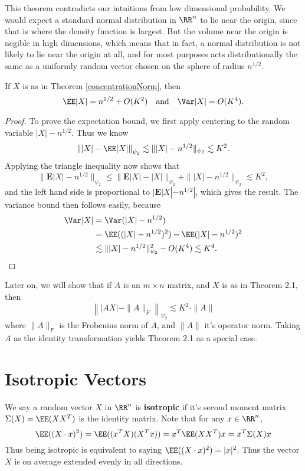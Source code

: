 This theorem contradicts our intuitions from low dimensional probability. We would expect a standard normal distribution in $\RR^n$ to lie near the origin, since that is where the density function is largest. But the volume near the origin is negible in high dimensions, which means that in fact, a normal distribution is not likely to lie near the origin at all, and for most purposes acts distributionally the same as a uniformly random vector chosen on the sphere of radius $n^{1/2}$.

\begin{corollary}
    If $X$ is as in Theorem \ref{concentrationNorm}, then
    \[ \EE |X| = n^{1/2} + O(K^2)\quad\text{and}\quad\Var |X| = O(K^4). \]
\end{corollary}
\begin{proof}
    To prove the expectation bound, we first apply centering to the random variable $|X| - n^{1/2}$. Thus we know
    \[ \left\| |X| - \EE |X| \right\|_{\psi_2} \lesssim \| |X| - n^{1/2} \|_{\psi_2} \lesssim K^2. \]
    Applying the triangle inequality now shows that
    \[ \| \mathbf{E} |X| - n^{1/2} \|_{\psi_2} \leq \| \mathbf{E} |X| - |X| \|_{\psi_2} + \| |X| - n^{1/2} \|_{\psi_2} \lesssim K^2, \]
    and the left hand side is proportional to $| \mathbf{E} |X| - n^{1/2} |$, which gives the result. The variance bound then follows easily, because
    \begin{align*}
        \Var |X| &= \Var(|X| - n^{1/2})\\
        &= \EE((|X| - n^{1/2})^2) - \EE(|X| - n^{1/2})^2\\
        &\lesssim \| |X| - n^{1/2} \|_{\psi_2}^2 - O(K^4) \lesssim K^4. \qedhere
    \end{align*}
\end{proof}

Later on, we will show that if $A$ is an $m \times n$ matrix, and $X$ is as in Theorem 2.1, then
%
\[ \left\| |AX| - \| A \|_F \right\|_{\psi_2} \lesssim K^2 \cdot \| A \| \]
%
where $\| A \|_F$ is the Frobenius norm of $A$, and $\| A \|$ it's operator norm. Taking $A$ as the identity transformation yields Theorem 2.1 as a special case.

\section{Isotropic Vectors}

We say a random vector $X$ in $\RR^n$ is \textbf{isotropic} if it's second moment matrix $\Sigma(X) = \EE(XX^T)$ is the identity matrix. Note that for any $x \in \RR^n$,
%
\[ \EE((X \cdot x)^2) = \EE((x^T X)(X^T x)) = x^T \EE(XX^T) x = x^T \Sigma(X) x \]
%
Thus being isotropic is equivalent to saying $\EE((X \cdot x)^2) = |x|^2$. Thus the vector $X$ is on average extended evenly in all directions.

